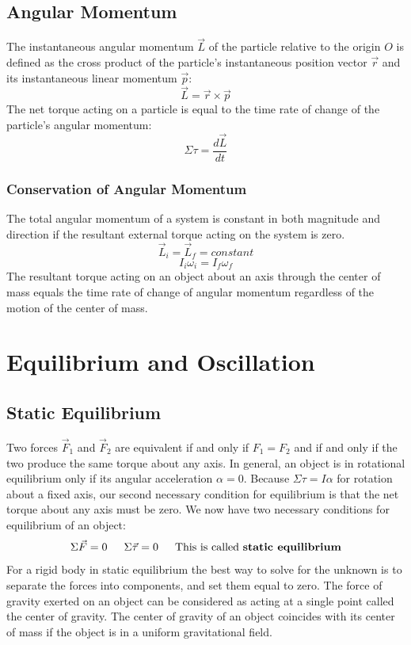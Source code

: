 \documentclass{article}
\begin{document}
\subsection{Angular Momentum}
The instantaneous angular momentum $\vec{L}$ of the particle relative to the origin $O$ is defined as the cross product of the particle’s instantaneous position vector $\vec{r}$ and its instantaneous linear momentum $\vec{p}$:
\[
\vec{L}=\vec{r}\times\vec{p}
\]
The net torque acting on a particle is equal to the time rate of change of the particle’s angular momentum:
\[
\Sigma\tau=\frac{d\vec{L}}{dt}
\]
\subsubsection{Conservation of Angular Momentum}
The total angular momentum of a system is constant in both magnitude and direction if the resultant external torque acting on the system is zero.
\[
\vec{L}_i=\vec{L}_f=constant
\]
\[
I_i\omega_i=I_f\omega_f
\]
The resultant torque acting on an object about an axis through the center of mass equals the time rate of change of angular momentum regardless of the motion of the center of mass.

\section{Equilibrium and Oscillation}
\subsection{Static Equilibrium}
Two forces $\vec{F}_1$ and $\vec{F}_2$ are equivalent if and only if $F_1=F_2$ and if and only if the two produce the same torque about any axis. In general, an object is in rotational equilibrium only if its angular acceleration $\alpha=0$. Because $\Sigma\tau=I\alpha$ for rotation about a fixed axis, our second necessary condition for equilibrium is that the net torque about any axis must be zero. We now have two necessary conditions for equilibrium of an object:
\[
\Sigma\vec{F}=0 \indent
\Sigma\vec{\tau}=0 \indent
\text{This is called \textbf{static equilibrium}}
\]
For a rigid body in static equilibrium the best way to solve for the unknown is to separate the forces into components, and set them equal to zero. The force of gravity exerted on an object can be considered as acting at a single point called the center of gravity. The center of gravity of an object coincides with its center of mass if the object is in a uniform gravitational field.
\end{document}
